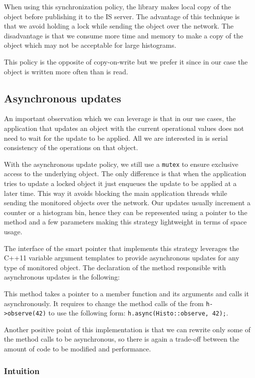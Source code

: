 When using this synchronization policy, the library makes local copy of the object before publishing it to the IS server. The advantage of this technique is that we avoid holding a lock while sending the object over the network. The disadvantage is that we consume more time and memory to make a copy of the object which may not be acceptable for large histograms.

This policy is the opposite of copy-on-write but we prefer it since in our case the object is written more often than is read.

\subsection{Asynchronous updates}

An important observation which we can leverage is that in our use cases, the application that updates an object with the current operational values does not need to wait for the update to be applied. All we are interested in is serial consistency of the operations on that object. 

With the asynchronous update policy, we still use a \verb+mutex+ to ensure exclusive access to the underlying object. The only difference is that when the application tries to update a locked object it just enqueues the update to be applied at a later time. This way it avoids blocking the main application threads while sending the monitored objects over the network. Our updates usually increment a counter or a histogram bin, hence they can be represented using a pointer to the method and a few parameters making this strategy lightweight in terms of space usage. 

The interface of the smart pointer that implements this strategy leverages the C++11 variable argument templates to provide asynchronous updates for any type of monitored object. The declaration of the method responsible with asynchronous updates is the following:


This method takes a pointer to a member function and its arguments and calls it asynchronously. It requires to change the method calls of the from \verb+h->observe(42)+ to use the following form: \verb+h.async(Histo::observe, 42);+.

Another positive point of this implementation is that we can rewrite only some of the method calls to be asynchronous, so there is again a trade-off between the amount of code to be modified and performance.

\subsubsection*{Intuition}

